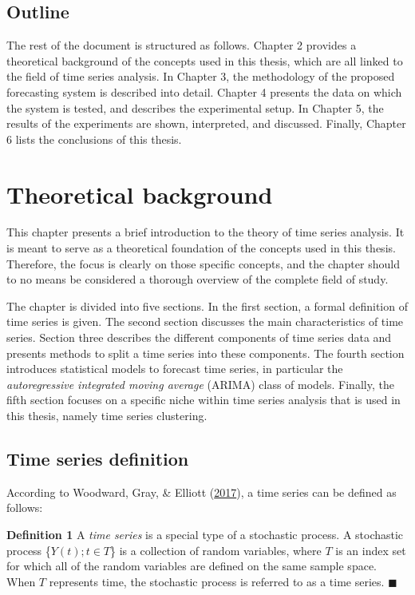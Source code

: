 \documentclass[12pt,oneside]{reedthesis}
\begin{document}
\section{Outline}\label{outline}

The rest of the document is structured as follows. Chapter 2 provides a
theoretical background of the concepts used in this thesis, which are
all linked to the field of time series analysis. In Chapter 3, the
methodology of the proposed forecasting system is described into detail.
Chapter 4 presents the data on which the system is tested, and describes
the experimental setup. In Chapter 5, the results of the experiments are
shown, interpreted, and discussed. Finally, Chapter 6 lists the
conclusions of this thesis.

\chapter{Theoretical background}\label{theoretical-background}

This chapter presents a brief introduction to the theory of time series
analysis. It is meant to serve as a theoretical foundation of the
concepts used in this thesis. Therefore, the focus is clearly on those
specific concepts, and the chapter should to no means be considered a
thorough overview of the complete field of study.

The chapter is divided into five sections. In the first section, a
formal definition of time series is given. The second section discusses
the main characteristics of time series. Section three describes the
different components of time series data and presents methods to split a
time series into these components. The fourth section introduces
statistical models to forecast time series, in particular the
\emph{autoregressive integrated moving average} (ARIMA) class of models.
Finally, the fifth section focuses on a specific niche within time
series analysis that is used in this thesis, namely time series
clustering.

\section{Time series definition}\label{time-series-definition}

According to Woodward, Gray, \& Elliott
(\protect\hyperlink{ref-woodward2017}{2017}), a time series can be
defined as follows:

\textbf{Definition 1} A \emph{time series} is a special type of a
stochastic process. A stochastic process \{\(Y(t); t \in T\)\} is a
collection of random variables, where \(T\) is an index set for which
all of the random variables are defined on the same sample space. When
\(T\) represents time, the stochastic process is referred to as a time
series. \(\blacksquare\)
\end{document}
